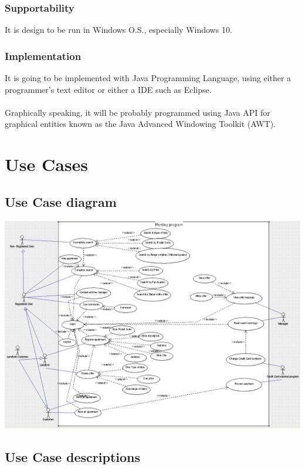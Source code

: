 \documentclass[12pt]{article}
\begin{document}
{\subsubsection{Supportability}
It is design to be run in Windows O.S., especially Windows 10.
\subsubsection{Implementation}
It is going to be implemented with Java Programming Language, using either a programmer's text editor or either a IDE such as Eclipse.\\\\ Graphically speaking, it will be probably programmed using Java API for graphical entities known as the Java Advanced Windowing Toolkit (AWT).\\
\section{Use Cases}
\subsection{Use Case diagram}
\begin{center}
	\includegraphics[scale=0.75]{UMLDiagram.PNG}
\end{center}
\subsection{Use Case descriptions}
}
\end{document}
